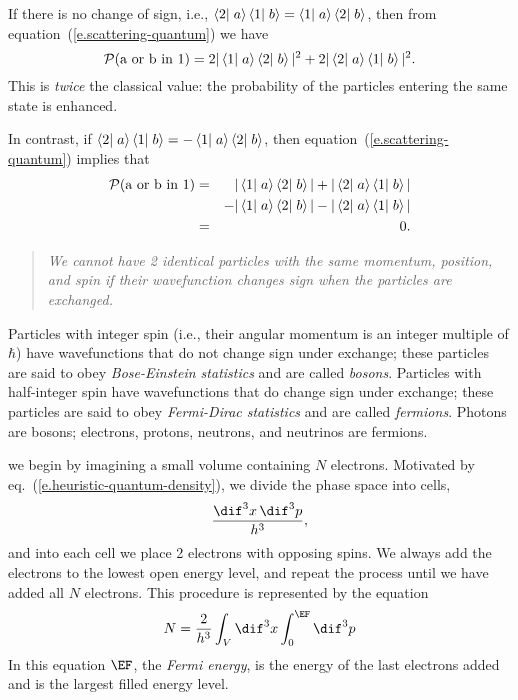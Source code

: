 \begin{sidebar}
If there is no change of sign, i.e., $\left\langle2\right|\left.a\right\rangle\left\langle1\right|\left.b\right\rangle = \left\langle1\right|\left.a\right\rangle\left\langle2\right|\left.b\right\rangle$, then from equation~(\ref{e.scattering-quantum}) we have
\begin{equation}\label{e.boson}
    \mathcal{P}(\textrm{a or b in 1}) = 2|\left\langle1\right|\left.a\right\rangle\left\langle2\right|\left.b\right\rangle|^2 + 2|\left\langle2\right|\left.a\right\rangle\left\langle1\right|\left.b\right\rangle|^2.
\end{equation}
This is \emph{twice} the classical value: the probability of the particles entering the same state is enhanced.

In contrast, if $\left\langle2\right|\left.a\right\rangle\left\langle1\right|\left.b\right\rangle = -\left\langle1\right|\left.a\right\rangle\left\langle2\right|\left.b\right\rangle$, then equation~(\ref{e.scattering-quantum}) implies that
\begin{eqnarray}
\mathcal{P}(\textrm{a or b in 1}) &=& |\left\langle1\right|\left.a\right\rangle\left\langle2\right|\left.b\right\rangle| + |\left\langle2\right|\left.a\right\rangle\left\langle1\right|\left.b\right\rangle| \nonumber\\ 
    && - |\left\langle1\right|\left.a\right\rangle\left\langle2\right|\left.b\right\rangle| - |\left\langle2\right|\left.a\right\rangle\left\langle1\right|\left.b\right\rangle| \nonumber\\ 
    &=& 0.\label{e.fermion}
\end{eqnarray}
\begin{quote}\itshape
We cannot have 2 identical particles with the same momentum, position, and spin if their wavefunction changes sign when the particles are exchanged.
\end{quote}
Particles with integer spin (i.e., their angular momentum is an integer multiple of $\hbar$) have wavefunctions that do not change sign under exchange; these particles are said to obey \emph{Bose-Einstein statistics} and are called \emph{bosons}.  Particles with half-integer spin have wavefunctions that do change sign under exchange; these particles are said to obey \emph{Fermi-Dirac statistics} and are called \emph{fermions}.  Photons are bosons; electrons, protons, neutrons, and neutrinos are fermions.
\end{sidebar}

 we begin by imagining a small volume containing $N$ electrons. Motivated by eq.~(\ref{e.heuristic-quantum-density}), we divide the phase space into cells,
\[
	\frac{\dif^{3}x\,\dif^{3}p}{h^{3}},
\]
and into each cell we place 2 electrons with opposing spins. We always add the electrons to the lowest open energy level, and repeat the process until we have added all $N$ electrons. This procedure is represented by the equation
\begin{equation}
\label{e.number-degenerate}
	N = \frac{2}{h^{3}}\int_{V}\dif^{3}x\int_{0}^{\EF}\dif^{3}p
\end{equation}
In this equation $\EF$, the \emph{Fermi energy}, is the energy of the last electrons added and is the largest filled energy level.

